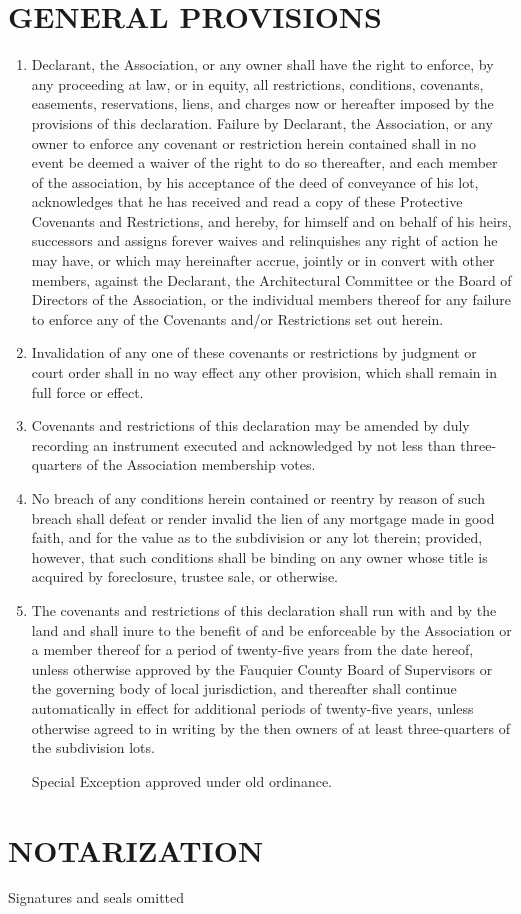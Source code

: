 \documentclass[12pt, letterpaper]{article}
\begin{document}
\section{GENERAL PROVISIONS}
\begin{enumerate}
\item Declarant, the Association, or any owner shall have the right to enforce, by any proceeding at law, or in equity, all restrictions, conditions, covenants, easements, reservations, liens, and charges now or hereafter imposed by the provisions of this declaration.
Failure by Declarant, the Association, or any owner to enforce any covenant or restriction herein contained shall in no event be deemed a waiver of the right to do so thereafter, and each member of the association, by his acceptance of the deed of conveyance of his lot, acknowledges that he has received and read a copy of these Protective Covenants and Restrictions, and hereby, for himself and on behalf of his heirs, successors and assigns forever waives and relinquishes any right of action he may have, or which may hereinafter accrue, jointly or in convert with other members, against the Declarant, the Architectural Committee or the Board of Directors of the Association, or the individual members thereof for any failure to enforce any of the Covenants and/or Restrictions set out herein.
\item Invalidation of any one of these covenants or restrictions by judgment or court order shall in no way effect any other provision, which shall remain in full force or effect.
\item Covenants and restrictions of this declaration may be amended by duly recording an instrument executed and acknowledged by not less than three-quarters of the Association membership votes.
\item No breach of any conditions herein contained or reentry by reason of such breach shall defeat or render invalid the lien of any mortgage made in good faith, and for the value as to the subdivision or any lot therein; provided, however, that such conditions shall be binding on any owner whose title is acquired by foreclosure, trustee sale, or otherwise.
\item The covenants and restrictions of this declaration shall run with and by the land and shall inure to the benefit of and be enforceable by the Association or a member thereof for a period of twenty-five years from the date hereof, unless otherwise approved by the Fauquier County Board of Supervisors or the governing body of local jurisdiction, and thereafter shall continue automatically in effect for additional periods of twenty-five years, unless otherwise agreed to in writing by the then owners of at least three-quarters of the subdivision lots.

Special Exception approved under old ordinance.
\end{enumerate}

\section{NOTARIZATION}
Signatures and seals omitted
\end{document}
